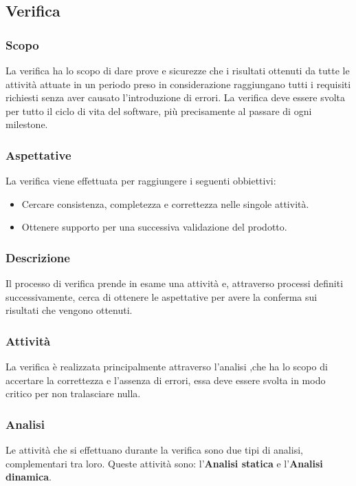 \subsection{Verifica}
	\subsubsection{Scopo}
		La verifica ha lo scopo di dare prove e sicurezze che i risultati ottenuti da tutte le attività attuate in un periodo preso in considerazione raggiungano tutti i requisiti richiesti senza aver causato l'introduzione di errori. La verifica deve essere svolta per tutto il ciclo di vita del software, più precisamente al passare di ogni milestone\glo.
	\subsubsection{Aspettative}
		La verifica viene effettuata per raggiungere i seguenti obbiettivi:
		\begin{itemize}
			\item Cercare consistenza, completezza e correttezza nelle singole attività.
			\item Ottenere supporto per una successiva validazione del prodotto.
		\end{itemize}
	\subsubsection{Descrizione}
		Il processo di verifica prende in esame una attività e, attraverso processi definiti successivamente, cerca di ottenere le aspettative per avere la conferma sui risultati che vengono ottenuti.
	\subsubsection{Attività}
		La verifica è realizzata principalmente attraverso l'analisi ,che ha lo scopo di accertare la correttezza e l'assenza di errori, essa deve essere svolta in modo critico per non tralasciare nulla.
	\subsubsection{Analisi}
		 Le attività che si effettuano durante la verifica sono due tipi di analisi, complementari tra loro. Queste attività sono: l'\textbf{Analisi statica} e l'\textbf{Analisi dinamica}.
